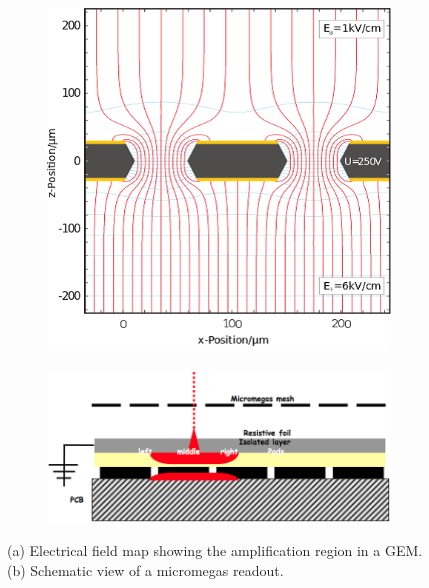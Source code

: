 \begin{figure}[t!]
\begin{subfigure}{0.49 \textwidth}
\includegraphics[width=1\hsize,viewport={0 -10 600 500},clip]{Detector/fig/GEM.png} 
\caption{}
\end{subfigure}
\begin{subfigure}{0.49\textwidth}
\includegraphics[width=1.0\hsize]{Detector/fig/micromegas.png}
\caption{}
\end{subfigure}
\caption[TPC readout]{(a) Electrical field map showing the amplification region in a GEM. (b) Schematic view of a micromegas readout.}
\label{fig:det:TPC_readout}
\end{figure}

